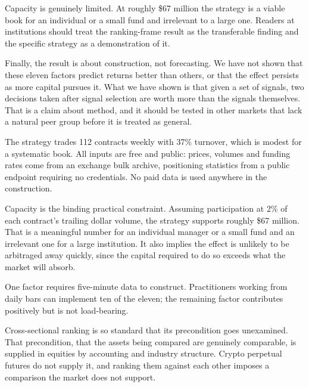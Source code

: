 \documentclass[12pt]{article}
\makeatletter
\renewcommand{\section}[1]{\par\vspace{16pt}%
  \noindent{\bfseries\MakeUppercase{#1}}\par\nobreak\vspace{4pt}%
  \@afterindenttrue\@afterheading}
\makeatother
\begin{document}
Capacity is genuinely limited. At roughly \$67 million the strategy is a viable
book for an individual or a small fund and irrelevant to a large one. Readers at
institutions should treat the ranking-frame result as the transferable finding and
the specific strategy as a demonstration of it.

Finally, the result is about construction, not forecasting. We have not shown that
these eleven factors predict returns better than others, or that the effect
persists as more capital pursues it. What we have shown is that given a set of
signals, two decisions taken after signal selection are worth more than the
signals themselves. That is a claim about method, and it should be tested in other
markets that lack a natural peer group before it is treated as general.

\section{Costs, Capacity and Implementation}

The strategy trades 112 contracts weekly with 37\% turnover, which is modest for a
systematic book. All inputs are free and public: prices, volumes and funding rates
come from an exchange bulk archive, positioning statistics from a public endpoint
requiring no credentials. No paid data is used anywhere in the construction.

Capacity is the binding practical constraint. Assuming participation at 2\% of
each contract's trailing dollar volume, the strategy supports roughly \$67
million. That is a meaningful number for an individual manager or a small fund and
an irrelevant one for a large institution. It also implies the effect is unlikely
to be arbitraged away quickly, since the capital required to do so exceeds what
the market will absorb.

One factor requires five-minute data to construct. Practitioners working from
daily bars can implement ten of the eleven; the remaining factor contributes
positively but is not load-bearing.

\section{Conclusion}

Cross-sectional ranking is so standard that its precondition goes unexamined.
That precondition, that the assets being compared are genuinely comparable, is
supplied in equities by accounting and industry structure. Crypto perpetual
futures do not supply it, and ranking them against each other imposes a
comparison the market does not support.
\end{document}

